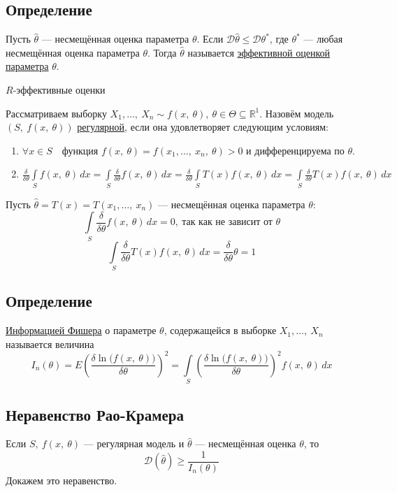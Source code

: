 \documentclass[12pt, a4paper]{article}
\newcommand{\dev}{\mathcal{D}}
\begin{document}
\subsection*{Определение}
Пусть $\hat{\theta}$ --- несмещённая оценка параметра $\theta$. Если $\dev\hat{\theta} \leq \dev \theta^*$, где $\theta^*$ --- любая несмещённая оценка параметра $\theta$. Тогда $\hat{\theta}$ называется \underline{эффективной оценкой параметра} $\theta$.
\begin{center}
    $R$-эффективные оценки
\end{center}
Рассматриваем выборку $X_1,\ldots,\ X_n \sim f(x,\ \theta),\ \theta\in \Theta \subseteq \mathbb{R}^1$. Назовём модель $(S,\ f(x,\ \theta))$ \underline{регулярной}, если она удовлетворяет следующим условиям:
\begin{enumerate}
    \item $\forall x\in S\quad \text{функция } f(x,\ \theta) = f(x_1,\dots,\ x_n,\ \theta) > 0$ и дифференцируема по $\theta$.
    \item $\displaystyle\frac{\delta}{\delta \theta} \int\limits_S f(x,\ \theta)\, dx = \int\limits_S \frac{\delta}{\delta \theta} f(x,\ \theta)\, dx = \frac{\delta}{\delta \theta} \int\limits_S T(x)f(x,\ \theta)\, dx = \int\limits_S \frac{\delta}{\delta \theta} T(x) f(x,\ \theta)\, dx$
\end{enumerate}
Пусть $\hat{\theta} = T(x) = T(x_1,\dots,\ x_n)$ --- несмещённая оценка параметра $\theta$:
\[\int\limits_S \frac{\delta}{\delta \theta} f(x,\ \theta)\, dx = 0,\ \text{так как не зависит от $\theta$}\]
\[\int\limits_S \frac{\delta}{\delta \theta} T(x) f(x,\ \theta)\, dx = \frac{\delta}{\delta \theta}\theta = 1\]
\subsection*{Определение}
\underline{Информацией Фишера} о параметре $\theta$, содержащейся в выборке $X_1,\dots,\ X_n$ называется величина
\[I_n(\theta) = E\left( \frac{\delta \ln \big(f(x,\ \theta)\big)}{\delta \theta} \right)^2 = \int\limits_S\left( \frac{\delta \ln \big(f(x,\ \theta)\big)}{\delta \theta} \right)^2 f(x,\ \theta)\, dx\]
\subsection*{Неравенство Рао-Крамера}
Если $S,\ f(x,\ \theta)$ --- регулярная модель и $\hat{\theta}$ --- несмещённая оценка $\theta$, то 
\[\dev (\hat{\theta}) \geq \frac{1}{I_n(\theta)}\]
Докажем это неравенство.
\end{document}
